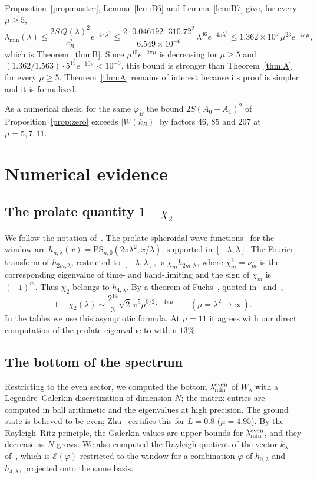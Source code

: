 \documentclass[11pt]{amsart}
\theoremstyle{definition}
\theoremstyle{remark}
\numberwithin{equation}{section}
\newcommand{\E}{\mathcal{E}}
\begin{document}
Proposition~\ref{prop:master}, Lemma~\ref{lem:B6} and Lemma~\ref{lem:B7} give, for every $\mu\ge5$,
\[
\lambda_{\min}(\lambda)\le\frac{2S\,Q(\lambda)^2}{c_B^2}e^{-4\pi\lambda^2}\le\frac{2\cdot0.046192\cdot310.72^2}{6.549\times10^{-6}}\,\lambda^{46}e^{-4\pi\lambda^2}\le1.362\times10^{9}\,\mu^{23}e^{-4\pi\mu},
\]
which is Theorem~\ref{thm:B}. Since $\mu^{15}e^{-2\pi\mu}$ is decreasing for $\mu\ge5$ and $(1.362/1.563)\cdot5^{15}e^{-10\pi}<10^{-3}$, this bound is stronger than Theorem~\ref{thm:A} for every $\mu\ge5$. Theorem~\ref{thm:A} remains of interest because its proof is simpler and it is formalized.

As a numerical check, for the same $\varphi_B$ the bound $2S(A_0+A_1)^2$ of Proposition~\ref{prop:zero} exceeds $|W(k_B)|$ by factors $46$, $85$ and $207$ at $\mu=5,7,11$.

\section{Numerical evidence}\label{sec:numerics}

\subsection{The prolate quantity \texorpdfstring{$1-\chi_2$}{1-chi\_2}}
We follow the notation of~\cite[\S6]{Connes26}. The prolate spheroidal wave functions~\cite{SP61} for the window are $h_{n,\lambda}(x)=\mathrm{PS}_{n,0}(2\pi\lambda^2,x/\lambda)$, supported in $[-\lambda,\lambda]$. The Fourier transform of $h_{2m,\lambda}$, restricted to $[-\lambda,\lambda]$, is $\chi_m h_{2m,\lambda}$, where $\chi_m^2=\nu_m$ is the corresponding eigenvalue of time- and band-limiting and the sign of $\chi_m$ is $(-1)^m$. Thus $\chi_2$ belongs to $h_{4,\lambda}$. By a theorem of Fuchs~\cite[Thm.~1]{Fuchs64}, quoted in~\cite{CCM25} and~\cite[footnote~19]{Connes26},
\[
1-\chi_2(\lambda)\sim\frac{2^{14}}{3}\sqrt2\,\pi^5\mu^{9/2}e^{-4\pi\mu}\qquad(\mu=\lambda^2\to\infty).
\]
In the tables we use this asymptotic formula. At $\mu=11$ it agrees with our direct computation of the prolate eigenvalue to within $13\%$.

\subsection{The bottom of the spectrum}
Restricting to the even sector, we computed the bottom $\lambda_{\min}^{\rm even}$ of $W_\lambda$ with a Legendre--Galerkin discretization of dimension $N$; the matrix entries are computed in ball arithmetic and the eigenvalues at high precision. The ground state is believed to be even; Zhu~\cite[Thm.~6.2]{Zhu26} certifies this for $L=0.8$ ($\mu=4.95$). By the Rayleigh--Ritz principle, the Galerkin values are upper bounds for $\lambda_{\min}^{\rm even}$, and they decrease as $N$ grows. We also computed the Rayleigh quotient of the vector $k_\lambda$ of~\cite{CCM25}, which is $\E(\varphi)$ restricted to the window for a combination $\varphi$ of $h_{0,\lambda}$ and $h_{4,\lambda}$, projected onto the same basis.
\end{document}

